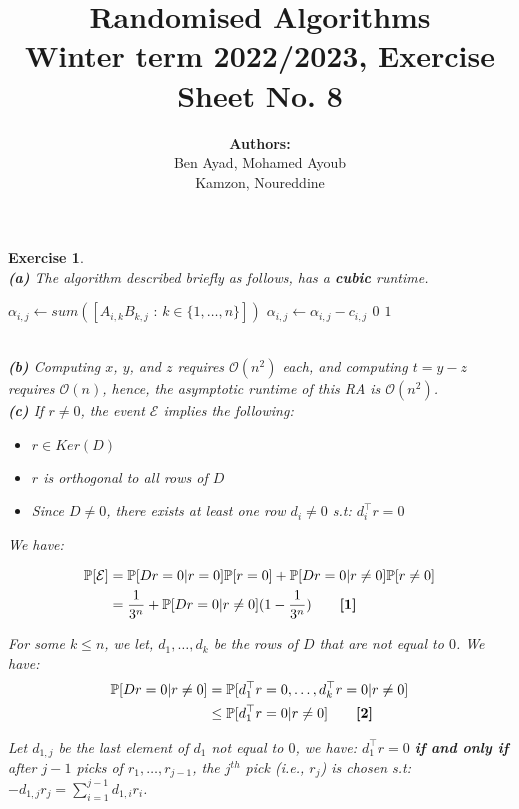 \documentclass{article}
\title{Randomised Algorithms \\
Winter term 2022/2023, Exercise Sheet No. 8}
\author{
    \textbf{Authors:} \\
    Ben Ayad, Mohamed Ayoub \\
    Kamzon, Noureddine
}
\newtheorem{exo}{Exercise}
\def\P{\mathbb{P}}
\begin{document}
\maketitle

\begin{exo}{\ \\}
\noindent
\textbf{(a)}  The algorithm described briefly as follows, has a \textbf{cubic} runtime.

\begin{algorithmic}[1]
    \State $\alpha_{i,j} \gets sum([A_{i,k}B_{k,j} \text{ : } k \in \{1,\dots ,n\}])$ 
    \State $\alpha_{i,j} \gets \alpha_{i,j} - c_{i,j}$
    \State \Return $0$
\EndIf
\EndFor 
\State \Return $1$
\end{algorithmic}


\noindent
\\\textbf{(b)}  Computing $x$, $y$, and $z$ requires $\mathcal{O}(n^2)$ each, and computing $t = y-z$ requires $\mathcal{O}(n)$, hence, the asymptotic runtime of this RA is $\mathcal{O}(n^2)$.\\

\noindent
\textbf{(c)} If $r \neq 0$, the event $\mathcal{E}$ implies the following:
\begin{itemize}
    \item $r \in Ker(D)$
    \item $r$ is orthogonal to all rows of $D$
    \item Since $D \neq 0$, there exists at least one row $d_i \neq 0$ s.t: $d_i^\top r = 0$
\end{itemize}

We have:

\begin{align*}
    \P[\mathcal{E}] 
    &= \P[Dr=0|r=0]\P[r=0] + \P[Dr=0|r\neq0]\P[r\neq0] \\
    &= \frac{1}{3^n} + \P[Dr=0|r\neq0](1-\frac{1}{3^n}) \quad \quad  \text{\textbf{[1]}}
\end{align*}


For some $k\leq n$, we let, $d_1, \dots, d_k$  be the rows of $D$ that are not equal to $0$. We have:
\begin{align*}
    \P[Dr=0|r\neq0]
    &= \P[d_1^\top r = 0, \dots, d_k^\top r = 0 |  r\neq0] \\
    &\leq \P[d_1^\top r = 0 | r\neq0]    \quad \quad  \text{\textbf{[2]}}
\end{align*}

Let $d_{1,j}$ be the last element of $d_1$ not equal to $0$, we have: $d_1^\top r=0$ \textbf{if and only if} after $j-1$ picks of $r_1, \dots , r_{j-1}$, the $j^{th}$ pick (i.e., $r_j$) is chosen s.t:   $-d_{1,j} r_j = \sum^{j-1}_{i=1} d_{1,i} r_i $.


\end{exo}
\end{document}
